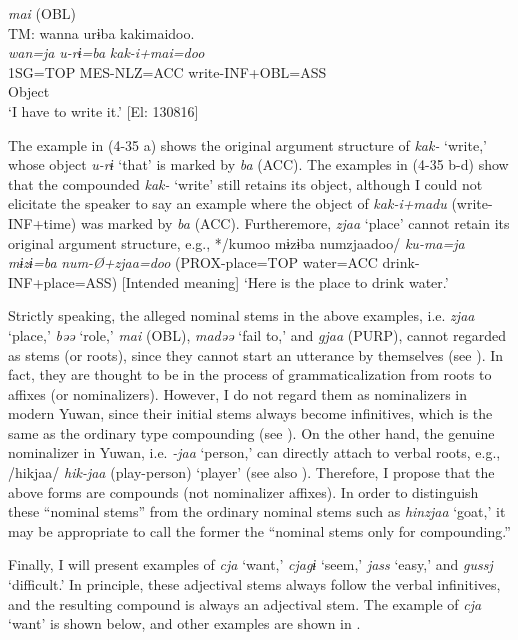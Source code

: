 \ex \textit{mai} (OBL)\\
\gllll  TM:  wanna  urɨba  kakimaidoo.\\
    \textit{wan=ja}  \textit{u-rɨ=ba}  \textit{kak-i+mai=doo}\\
    1SG=TOP  MES-NLZ=ACC  write-INF+OBL=ASS\\
      Object  \\
    \glt     ‘I have to write it.’ [El: 130816]
    \z
\z

The example in (4-35 a) shows the original argument structure of \textit{kak-} ‘write,’ whose object \textit{u-rɨ} ‘that’ is marked by \textit{ba} (ACC). The examples in (4-35 b-d) show that the compounded \textit{kak-} ‘write’ still retains its object, although I could not elicitate the speaker to say an example where the object of \textit{kak-i+madu} (write-INF+time) was marked by \textit{ba} (ACC). Furtheremore, \textit{zjaa} ‘place’ cannot retain its original argument structure, e.g., */kumoo mɨzɨba numzjaadoo/ \textit{ku-ma=ja} \textit{mɨzɨ=ba} \textit{num-Ø+zjaa=doo} (PROX-place=TOP water=ACC drink-INF+place=ASS) [Intended meaning] ‘Here is the place to drink water.’

Strictly speaking, the alleged nominal stems in the above examples, i.e. \textit{zjaa} ‘place,’ \textit{bəə} ‘role,’ \textit{mai} (OBL), \textit{madəə} ‘fail to,’ and \textit{gjaa} (PURP), cannot regarded as stems (or roots), since they cannot start an utterance by themselves (see ). In fact, they are thought to be in the process of grammaticalization from roots to affixes (or nominalizers). However, I do not regard them as nominalizers in modern Yuwan, since their initial stems always become infinitives, which is the same as the ordinary type compounding (see ). On the other hand, the genuine nominalizer in Yuwan, i.e. \textit{{}-jaa} ‘person,’ can directly attach to verbal roots, e.g., /hikjaa/ \textit{hik-jaa} (play-person) ‘player’ (see also ). Therefore, I propose that the above forms are compounds (not nominalizer affixes). In order to distinguish these “nominal stems” from the ordinary nominal stems such as \textit{hinzjaa} ‘goat,’ it may be appropriate to call the former the “nominal stems only for compounding.”

Finally, I will present examples of \textit{cja} ‘want,’ \textit{cjagɨ} ‘seem,’ \textit{jass} ‘easy,’ and \textit{gussj} ‘difficult.’ In principle, these adjectival stems always follow the verbal infinitives, and the resulting compound is always an adjectival stem. The example of \textit{cja} ‘want’ is shown below, and other examples are shown in .

